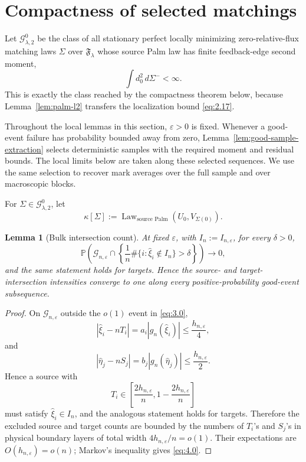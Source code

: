 \documentclass[11pt,reqno]{amsart}
\newtheorem{lemma}[theorem]{Lemma}
\theoremstyle{definition}
\theoremstyle{remark}
\numberwithin{equation}{section}
\newcommand{\Pp}{\mathbb P}
\newcommand{\cF}{\mathfrak F}
\begin{document}
\section{Compactness of selected matchings}
\label{sec:compactness}

Let \(\mathcal G_{\lambda,2}^0\) be the class of all stationary perfect
locally minimizing zero-relative-flux matching laws \(\Sigma\) over
\(\cF_\lambda\) whose source Palm law has finite feedback-edge second
moment,
\begin{equation}
\int d_0^2\,d\Sigma^-<\infty.
\label{eq:4.0E}
\end{equation}
This is exactly the class reached by the compactness theorem below,
because Lemma~\ref{lem:palm-l2} transfers the localization bound \eqref{eq:2.17}.

Throughout the local lemmas in this section, \(\varepsilon>0\) is fixed.
Whenever a good-event failure has probability bounded away from zero,
Lemma~\ref{lem:good-sample-extraction} selects deterministic samples
with the required moment and residual bounds.  The local
limits below are taken along these selected sequences.  We use the same
selection to recover mark averages over the full sample and over
macroscopic blocks.

For \(\Sigma\in\mathcal G_{\lambda,2}^0\), let
\[
\kappa[\Sigma]
:=
\operatorname{Law}_{\text{source Palm}}(U_0,V_{\Sigma(0)}).
\]

\begin{lemma}[Bulk intersection count]
\label{lem:bulk-count}
At fixed \(\varepsilon\), with \(I_n:=I_{n,\varepsilon}\), for every
\(\delta>0\),
\begin{equation}
\Pp\left(
\mathcal G_{n,\varepsilon}\cap
\left\{\frac1n\#\{i:\widehat\xi_i\notin I_n\}>\delta\right\}
\right)\to0,
\label{eq:4.0}
\end{equation}
and the same statement holds for targets.  Hence the source- and
target-intersection intensities converge to one along every
positive-probability good-event subsequence.
\end{lemma}

\begin{proof}
On \(\mathcal G_{n,\varepsilon}\) outside the \(o(1)\) event in \eqref{eq:3.0},
\[
|\widehat\xi_i-nT_i|
=
a_i|g_n(\widehat\xi_i)|
\le \frac{h_{n,\varepsilon}}{4},
\]
and
\[
|\widehat\eta_j-nS_j|
=
b_j|g_n(\widehat\eta_j)|
\le \frac{h_{n,\varepsilon}}{2}.
\]
Hence a source with
\[
T_i\in\left[\frac{2h_{n,\varepsilon}}{n},1-\frac{2h_{n,\varepsilon}}{n}\right]
\]
must satisfy \(\widehat\xi_i\in I_n\), and the analogous statement holds
for targets.  Therefore the excluded source and target counts are bounded
by the numbers of \(T_i\)'s and \(S_j\)'s in physical boundary layers of
total width \(4h_{n,\varepsilon}/n=o(1)\).  Their expectations are \(O(h_{n,\varepsilon})=o(n)\);
Markov's inequality gives \eqref{eq:4.0}.
\end{proof}
\end{document}
